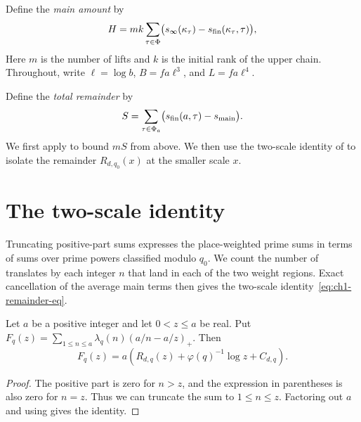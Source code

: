 \begin{definition}
\label{def:main-amount}
\emitthmsource
Define the \emph{main amount} by
\begin{equation}
 H=mk\sum_{\tau\in\Phi}
       \bigl(s_\infty(\kappa_\tau)-s_{\rm fin}(\kappa_\tau,\tau)\bigr),
\label{eq:main-amount}
\end{equation}
Here $m$ is the number of lifts and $k$ is the initial rank of the upper chain. Throughout, write
$\ell=\log b$, $B=fa\ell^3$, and $L=fa\ell^4$.
\end{definition}

\begin{definition}
\label{def:total-remainder}
\emitthmsource
Define the \emph{total remainder} by
\[
 S=\sum_{\tau\in\Phi_a}\bigl(s_{\rm fin}(a,\tau)-s_{\rm main}\bigr).
\]
We first apply  to bound $mS$ from above. We then use the two-scale identity of  to isolate the remainder $R_{d,q_0}(x)$ at the smaller scale $x$.
\end{definition}

\section{The two-scale identity}
\label{sec:two-scale-identity}

Truncating positive-part sums expresses the place-weighted prime sums in terms of sums over prime powers classified modulo $q_0$. We count the number of translates by each integer $n$ that land in each of the two weight regions. Exact cancellation of the average main terms then gives the two-scale identity~\eqref{eq:ch1-remainder-eq}.

\begin{lemma}
\label{lem:positive-part-cutoff}
\emitthmsource
Let $a$ be a positive integer and let $0<z\le a$ be real. Put
$F_q(z)=\sum_{1\le n\le a}\lambda_q(n)(a/n-a/z)_+$. Then
\[
 F_q(z)=a\left(R_{d,q}(z)+\varphi(q)^{-1}\log z+C_{d,q}\right).
\]
\end{lemma}
\begin{proof}
The positive part is zero for $n>z$, and the expression in parentheses is also zero for $n=z$. Thus we can truncate the sum to $1\le n\le z$. Factoring out $a$ and using  gives the identity.
\end{proof}

